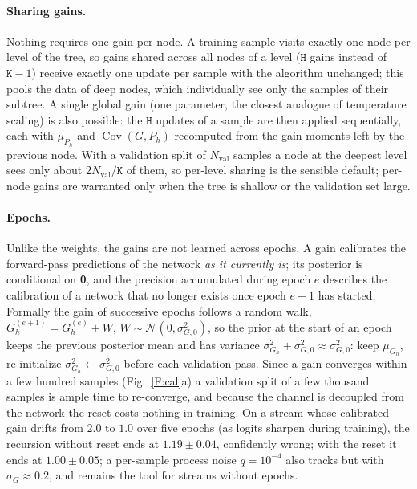 \documentclass[letterpaper]{article}
\begin{document}
\paragraph{Sharing gains.} Nothing requires one gain per node. A training sample visits exactly one node per level of the tree, so gains shared across all nodes of a level ($\mathtt H$ gains instead of $\mathtt K-1$) receive exactly one update per sample with the algorithm unchanged; this pools the data of deep nodes, which individually see only the samples of their subtree. A single global gain (one parameter, the closest analogue of temperature scaling) is also possible: the $\mathtt H$ updates of a sample are then applied sequentially, each with $\mu_{P_h}$ and $\operatorname{Cov}(G,P_h)$ recomputed from the gain moments left by the previous node. With a validation split of $N_{\text{val}}$ samples a node at the deepest level sees only about $2N_{\text{val}}/\mathtt K$ of them, so per-level sharing is the sensible default; per-node gains are warranted only when the tree is shallow or the validation set large.

\paragraph{Epochs.} Unlike the weights, the gains are not learned across epochs. A gain calibrates the forward-pass predictions of the network \emph{as it currently is}; its posterior is conditional on $\bm\theta$, and the precision accumulated during epoch $e$ describes the calibration of a network that no longer exists once epoch $e+1$ has started. Formally the gain of successive epochs follows a random walk, $G_h^{(e+1)}=G_h^{(e)}+W$, $W\sim\mathcal N(0,\sigma^2_{G,0})$, so the prior at the start of an epoch keeps the previous posterior mean and has variance $\sigma^2_{G_h}+\sigma^2_{G,0}\approx\sigma^2_{G,0}$: keep $\mu_{G_h}$, re-initialize $\sigma^2_{G_h}\leftarrow\sigma^2_{G,0}$ before each validation pass. Since a gain converges within a few hundred samples (Fig.~\ref{F:cal}a) a validation split of a few thousand samples is ample time to re-converge, and because the channel is decoupled from the network the reset costs nothing in training. On a stream whose calibrated gain drifts from $2.0$ to $1.0$ over five epochs (as logits sharpen during training), the recursion without reset ends at $1.19\pm0.04$, confidently wrong; with the reset it ends at $1.00\pm0.05$; a per-sample process noise $q=10^{-4}$ also tracks but with $\sigma_G\approx0.2$, and remains the tool for streams without epochs.
\end{document}
